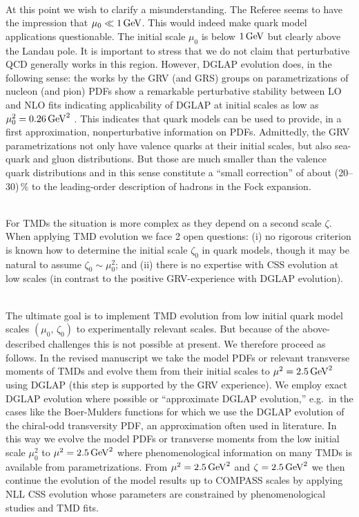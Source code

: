 \documentclass[a4paper]{article}
\begin{document}
\ \\
At this point we wish to clarify a misunderstanding. The Referee seems 
to have the impression that $\mu_0\ll 1\,{\rm GeV}$. This would indeed 
make quark model applications questionable. The initial scale $\mu_0$ 
is below $1\,{\rm GeV}$ but clearly above the Landau pole. It is important 
to stress that we do not claim that perturbative QCD generally works in 
this region. However, DGLAP evolution does, in the following sense:
the works by the GRV (and GRS) groups on parametrizations of nucleon 
(and pion)
PDFs show a remarkable perturbative stability between LO and NLO fits
indicating applicability of DGLAP at initial scales as low as 
$\mu_0^2 = 0.26\,{\rm GeV}^2$ 
\cite{Gluck:1991ng,Gluck:1991ey,Gluck:1994uf,Gluck:1998xa,Gluck:1999xe}.
This indicates that quark models can be used to
provide, in a first approximation, nonperturbative information on PDFs.
Admittedly, the GRV parametrizations not only have valence quarks at 
their initial scales, but also sea-quark and gluon distributions.
But those are much smaller than the valence quark distributions and in
this sense constitute a ``small correction'' of about (20--30)$\,\%$ 
to the leading-order description of hadrons in the Fock expansion.


\ \\
For TMDs the situation is more complex as they depend on a second 
scale $\zeta$. When applying TMD evolution we face 2 open questions: 
(i) no rigorous criterion is known how to determine the initial 
scale $\zeta_0$ in quark models, though it may be natural to assume 
$\zeta_0 \sim \mu_0^2$; and 
(ii) there is no expertise with CSS evolution at low scales
(in contrast to the positive GRV-experience with
DGLAP evolution).

\ \\
The ultimate goal is to implement TMD evolution from 
low initial quark model scales $(\mu_0,\,\zeta_0)$ to experimentally 
relevant scales. But because of the above-described challenges this 
is not possible at present. We therefore proceed as follows. 
In the revised manuscript 
we take the model PDFs or relevant transverse moments of TMDs and evolve 
them from their initial scales to $\mu^2 = 2.5\,{\rm GeV}^2$ using DGLAP 
(this step is supported by the GRV experience).
We employ exact DGLAP evolution where possible or ``approximate DGLAP 
evolution,'' e.g.\ in the cases like the Boer-Mulders functions for
which we use the DGLAP evolution of the chiral-odd transversity PDF, 
an approximation often used in literature. In this way we evolve
the model PDFs or transverse moments from the low initial scale $\mu_0^2$ 
to $\mu^2 = 2.5\,{\rm GeV}^2$ where phenomenological information on many 
TMDs is available from parametrizations. From  
$\mu^2 = 2.5\,{\rm GeV}^2$ and $\zeta = 2.5\,{\rm GeV}^2$ 
we then continue the evolution of the model results up to COMPASS scales
by applying NLL CSS evolution whose parameters are constrained by 
phenomenological studies and TMD fits.
\end{document}
